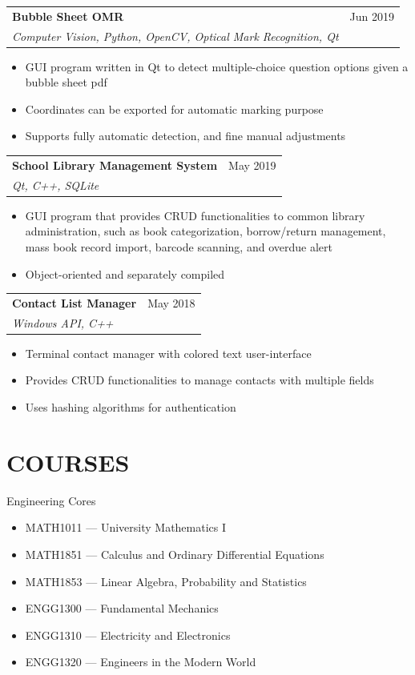 \documentclass{article}
\newcommand{\jobTitle}[3]{
\vspace{0.4cm}
\begin{tabularx}{0.99\linewidth}{ X r }
    \textbf{#1} & #2\\
    \textit{#3} &
\end{tabularx}
\vspace{0.2cm}
}
\newenvironment{descitemize}
{ \begin{itemize}[leftmargin=1.4cm,,topsep=0pt]
    \setlength{\parskip}{0pt}
    \setlength{\parsep}{0pt}     }
{ \end{itemize}                  }
\begin{document}
\jobTitle
{Bubble Sheet OMR}
{Jun 2019}
{Computer Vision, Python, OpenCV, Optical Mark Recognition, Qt}
\begin{descitemize}
    \item GUI program written in Qt to detect multiple-choice question options given a bubble sheet pdf
    \item Coordinates can be exported for automatic marking purpose
    \item Supports fully automatic detection, and fine manual adjustments
\end{descitemize}

\jobTitle
{School Library Management System}
{May 2019}
{Qt, C++, SQLite}
\begin{descitemize}
    \item GUI program that provides CRUD functionalities to common library administration, such as book categorization, borrow/return management, mass book record import, barcode scanning, and overdue alert
    \item Object-oriented and separately compiled
\end{descitemize}

\jobTitle
{Contact List Manager}
{May 2018}
{Windows API, C++}
\begin{descitemize}
    \item Terminal contact manager with colored text user-interface
    \item Provides CRUD functionalities to manage contacts with multiple fields
    \item Uses hashing algorithms for authentication
\end{descitemize}

\section{COURSES}
\vspace{0.3cm}

Engineering Cores
\begin{itemize}
    \item[] MATH1011 --- University Mathematics I
    \item[] MATH1851 --- Calculus and Ordinary Differential Equations
    \item[] MATH1853 --- Linear Algebra, Probability and Statistics
    \item[] ENGG1300 --- Fundamental Mechanics
    \item[] ENGG1310 --- Electricity and Electronics
    \item[] ENGG1320 --- Engineers in the Modern World
\end{itemize}
\end{document}
